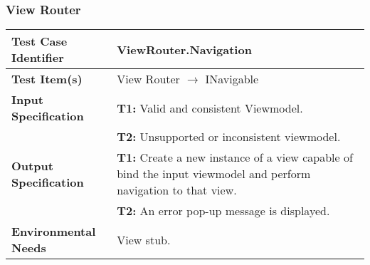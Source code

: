{\subsubsection{View Router}
\noindent
\begin{tabularx}{\textwidth}{l X}
    \hline 
    \textbf{Test Case Identifier} & ViewRouter.Navigation\\ 
    \hline 
    
    \textbf{Test Item(s)} & View Router $\rightarrow$ INavigable\\
    \hline 
    
    \textbf{Input Specification} & \textbf{T1:} Valid and consistent Viewmodel.\\
                                & \textbf{T2:} Unsupported or inconsistent viewmodel.\\
    \hline 
    
    \textbf{Output Specification} & \textbf{T1:} Create a new instance of a view capable of bind the input viewmodel and perform navigation to that view.\\
                                & \textbf{T2:} An error pop-up message is displayed.\\
    \hline 
    
    \textbf{Environmental Needs} & View stub.\\
    \hline
\end{tabularx}
\bigskip 

}



